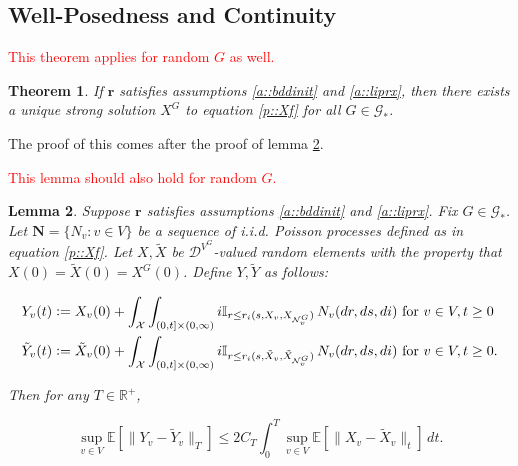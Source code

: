 \documentclass[12pt]{article}
\newcommand{\mb}{\mathbb}
\newcommand{\mc}{\mathcal}
\newcommand{\te}{\text}
\newcommand{\tr}{\textcolor{red}}
\newcommand{\ex}[1]{\mb{E}\left[#1\right]}			%
\newcommand{\defeq}{:=}								%
\newcommand{\cad}{\mc{D}}							%
\newcommand{\sta}{\mc{X}}							%
\newcommand{\gneigh}[2]{\mc{N}^{#1}_{#2}}			%
\newcommand{\Xf}{X}									%
\newcommand{\poiss}{N}								%
\newcommand{\rate}{r}								%
\newcommand{\poisses}{\mathbf{N}}					%
\newcommand{\poissv}[1]{_{#1}}						%
\newcommand{\vind}[1]{_{#1}}						%
\newcommand{\tme}[1]{(#1)}							%
\newcommand{\gind}[1]{^{#1}}						%
\newcommand{\vpara}[1]{^{#1}}						%
\newcommand{\stpara}[1]{_{#1}}						%
\newcommand{\tpara}[1]{_{#1}}						%
\newcommand{\rateset}{\mathbf{\rate}}				%
\newcommand{\jumpbd}[1]{C_{#1}}						%
\newcommand{\Gs}{\mc{G}_\ast}						%
\newcommand{\tmepro}[3]{
\ifstrempty{#3}{
	(#1,#2)}{
	(#1,#2,#3)}}									%
\newcommand{\Xg}{Y}									%
\newcommand{\alt}[1]{\tilde{#1}}					%
\newtheorem{thms}{Theorem}[section]
\newtheorem{lem}[thms]{Lemma}
\begin{document}
\subsection{Well-Posedness and Continuity}
\label{awl::wp}

\tr{This theorem applies for random \(G\) as well.}
\begin{thms}
If \(\rateset\) satisfies assumptions \ref{a::bddinit} and \ref{a::liprx}, then there exists a unique strong solution \(\Xf\gind{G}\) to equation \eqref{p::Xf} for all \(G \in \Gs\).
\label{wp::wp}
\end{thms}

The proof of this comes after the proof of lemma \ref{wp::Gronwall}.

\tr{This lemma should also hold for random \(G\).}

\begin{lem}
Suppose \(\rateset\) satisfies assumptions \ref{a::bddinit} and \ref{a::liprx}. Fix \(G \in \Gs\). Let \(\poisses = \{\poiss\poissv{v}:v \in V\}\) be a sequence of i.i.d. Poisson processes defined as in equation \eqref{p::Xf}. Let \(\Xf,\alt{\Xf}\) be \(\cad\vpara{V\gind{G}}\)-valued random elements with the property that \(\Xf\tme{0} = \alt{\Xf}\tme{0} = \Xf\gind{G}\tme{0}\). Define \(\Xg,\alt{\Xg}\) as follows:

\begin{align*}
\Xg\vind{v}\tme{t} &\defeq \Xf\vind{v}\tme{0} + \int_\sta\int_{(0,t]\times(0,\infty)} i\mb{I}_{r \leq \rate\stpara{i}\tmepro{s}{\Xf\vind{v}}{\Xf\vind{\gneigh{G}{v}}}}\,\poiss\poissv{v}(dr,ds,di) \te{ for } v \in V,t \geq 0\\
\alt{\Xg}\vind{v}\tme{t} &\defeq \alt{\Xf}\vind{v}\tme{0} + \int_\sta\int_{(0,t]\times(0,\infty)} i\mb{I}_{r \leq \rate\stpara{i}\tmepro{s}{\alt{\Xf}\vind{v}}{\alt{\Xf}\vind{\gneigh{G}{v}}}}\,\poiss\poissv{v}(dr,ds,di) \te{ for } v \in V,t \geq 0.\\
\end{align*}

Then for any \(T \in \mb{R}^+\),

\begin{equation}
\sup_{v\in V}\ex{\|\Xg\vind{v} - \alt{\Xg}\vind{v}\|\tpara{T}} \leq 2\jumpbd{T} \int_0^T \sup_{v \in V} \ex{\|\Xf\vind{v} - \alt{\Xf}\vind{v}\|\tpara{t}}\,dt.
\label{wp::Groneqn}
\end{equation}
\label{wp::Gronwall}
\end{lem}
\end{document}
